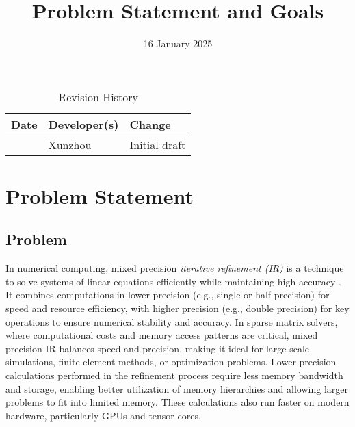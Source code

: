 \documentclass{article}
\title{Problem Statement and Goals\\\progname}
\author{\authname}
\date{}
\begin{document}
\maketitle

\begin{table}[hp]
  \caption{Revision History} \label{TblRevisionHistory}
  \begin{tabularx}{\textwidth}{llX}
    \toprule
    \textbf{Date} & \textbf{Developer(s)} & \textbf{Change}\\
    \midrule
    \date{16 January 2025} & Xunzhou & Initial draft \\
    \bottomrule
  \end{tabularx}
\end{table}

\section{Problem Statement}



\subsection{Problem}

In numerical computing, mixed precision \emph{iterative refinement (IR)} is a
technique to solve systems of linear equations efficiently while maintaining
high accuracy \cite{lindquist2020improvingperformancegmresmethod}. It combines
computations in lower precision (e.g., single or half precision) for speed and
resource efficiency, with higher precision (e.g., double precision) for key
operations to ensure numerical stability and accuracy. In sparse matrix solvers,
where computational costs and memory access patterns are critical, mixed
precision IR balances speed and precision, making it ideal for large-scale
simulations, finite element methods, or optimization problems. Lower precision
calculations performed in the refinement process require less memory bandwidth
and storage, enabling better utilization of memory hierarchies and allowing
larger problems to fit into limited memory. These calculations also run faster
on modern hardware, particularly GPUs and tensor cores.
\end{document}
